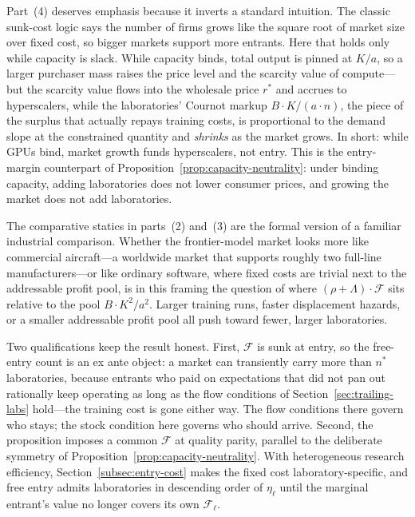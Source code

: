 \documentclass[11pt]{article}
\begin{document}
Part~(4) deserves emphasis because it inverts a standard intuition. The classic sunk-cost logic says the number of firms grows like the square root of market size over fixed cost, so bigger markets support more entrants. Here that holds only while capacity is slack. While capacity binds, total output is pinned at $K/a$, so a larger purchaser mass raises the price level and the scarcity value of compute---but the scarcity value flows into the wholesale price $r^{*}$ and accrues to hyperscalers, while the laboratories' Cournot markup $B\cdot K/(a\cdot n)$, the piece of the surplus that actually repays training costs, is proportional to the demand slope at the constrained quantity and \emph{shrinks} as the market grows. In short: while GPUs bind, market growth funds hyperscalers, not entry. This is the entry-margin counterpart of Proposition~\ref{prop:capacity-neutrality}: under binding capacity, adding laboratories does not lower consumer prices, and growing the market does not add laboratories.

The comparative statics in parts~(2) and~(3) are the formal version of a familiar industrial comparison. Whether the frontier-model market looks more like commercial aircraft---a worldwide market that supports roughly two full-line manufacturers---or like ordinary software, where fixed costs are trivial next to the addressable profit pool, is in this framing the question of where $(\rho+\Lambda)\cdot\mathcal F$ sits relative to the pool $B\cdot K^{2}/a^{2}$. Larger training runs, faster displacement hazards, or a smaller addressable profit pool all push toward fewer, larger laboratories.

Two qualifications keep the result honest. First, $\mathcal F$ is sunk at entry, so the free-entry count is an ex ante object: a market can transiently carry more than $n^{*}$ laboratories, because entrants who paid on expectations that did not pan out rationally keep operating as long as the flow conditions of Section~\ref{sec:trailing-labs} hold---the training cost is gone either way. The flow conditions there govern who stays; the stock condition here governs who should arrive. Second, the proposition imposes a common $\mathcal F$ at quality parity, parallel to the deliberate symmetry of Proposition~\ref{prop:capacity-neutrality}. With heterogeneous research efficiency, Section~\ref{subsec:entry-cost} makes the fixed cost laboratory-specific, and free entry admits laboratories in descending order of $\eta_\ell$ until the marginal entrant's value no longer covers its own $\mathcal F_\ell$.
\end{document}
